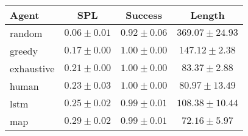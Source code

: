\begin{tabular}{lccc}
    \toprule
    Agent & SPL & Success & Length \\
    \midrule
    random & $0.06 \pm 0.01$ & $0.92 \pm 0.06$ & $369.07 \pm 24.93$\\
    greedy & $0.17 \pm 0.00$ & $1.00 \pm 0.00$ & $147.12 \pm 2.38$\\
    exhaustive & $0.21 \pm 0.00$ & $1.00 \pm 0.00$ & $83.37 \pm 2.88$\\
    human & $0.23 \pm 0.03$ & $1.00 \pm 0.00$ & $80.97 \pm 13.49$\\
    lstm & $0.25 \pm 0.02$ & $0.99 \pm 0.01$ & $108.38 \pm 10.44$\\
    map & $0.29 \pm 0.02$ & $0.99 \pm 0.01$ & $72.16 \pm 5.97$\\
    \bottomrule
\end{tabular}
